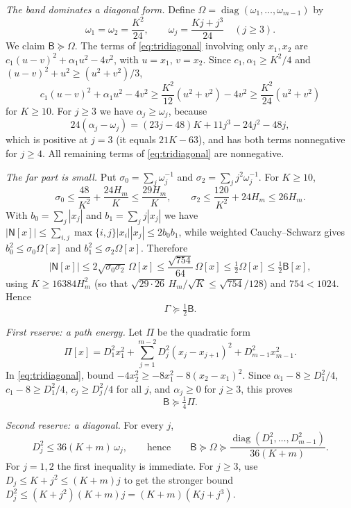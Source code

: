 \documentclass[11pt]{amsart}
\numberwithin{equation}{section}
\theoremstyle{definition}
\theoremstyle{remark}
\DeclareMathOperator{\diag}{diag}
\begin{document}
\emph{The band dominates a diagonal form.} Define
$\Omega=\diag(\omega_1,\dots,\omega_{m-1})$ by
\[
 \omega_1=\omega_2=\frac{K^2}{24},\qquad \omega_j=\frac{Kj+j^3}{24}\quad(j\ge3).
\]
We claim $\mathsf B\succeq\Omega$. The terms of \eqref{eq:tridiagonal}
involving only $x_1,x_2$ are $c_1(u-v)^2+\alpha_1u^2-4v^2$, with
$u=x_1$, $v=x_2$. Since $c_1,\alpha_1\ge K^2/4$ and
$(u-v)^2+u^2\ge(u^2+v^2)/3$,
\[
 c_1(u-v)^2+\alpha_1u^2-4v^2
 \ge\frac{K^2}{12}(u^2+v^2)-4v^2
 \ge\frac{K^2}{24}(u^2+v^2)
\]
for $K\ge10$. For $j\ge3$ we have $\alpha_j\ge\omega_j$, because
\[
 24(\alpha_j-\omega_j)=(23j-48)K+11j^3-24j^2-48j,
\]
which is positive at $j=3$ (it equals $21K-63$), and has both terms
nonnegative for $j\ge4$. All remaining terms of \eqref{eq:tridiagonal}
are nonnegative.

\emph{The far part is small.} Put $\sigma_0=\sum_j\omega_j^{-1}$ and
$\sigma_2=\sum_jj^2\omega_j^{-1}$. For $K\ge10$,
\[
 \sigma_0\le\frac{48}{K^2}+\frac{24H_m}{K}\le\frac{29H_m}{K},
 \qquad
 \sigma_2\le\frac{120}{K^2}+24H_m\le26H_m.
\]
With $b_0=\sum_j|x_j|$ and $b_1=\sum_jj|x_j|$ we have
$|\mathsf N[x]|\le\sum_{i,j}\max\{i,j\}|x_i||x_j|\le2b_0b_1$, while
weighted Cauchy--Schwarz gives $b_0^2\le\sigma_0\Omega[x]$ and
$b_1^2\le\sigma_2\Omega[x]$. Therefore
\begin{equation}\label{eq:remainder}
 |\mathsf N[x]|
 \le2\sqrt{\sigma_0\sigma_2}\,\Omega[x]
 \le\frac{\sqrt{754}}{64}\,\Omega[x]
 \le\tfrac12\Omega[x]\le\tfrac12\mathsf B[x],
\end{equation}
using $K\ge16384H_m^2$ (so that $\sqrt{29\cdot26}\,H_m/\sqrt K\le\sqrt{754}/128$)
and $754<1024$. Hence
\[
 \Gamma\succeq\tfrac12\mathsf B.
\]

\emph{First reserve: a path energy.} Let $\Pi$ be the quadratic form
\[
 \Pi[x]=D_1^2x_1^2+\sum_{j=1}^{m-2}D_j^2(x_j-x_{j+1})^2+D_{m-1}^2x_{m-1}^2.
\]
In \eqref{eq:tridiagonal}, bound $-4x_2^2\ge-8x_1^2-8(x_2-x_1)^2$. Since
$\alpha_1-8\ge D_1^2/4$, $c_1-8\ge D_1^2/4$, $c_j\ge D_j^2/4$ for all $j$,
and $\alpha_j\ge0$ for $j\ge3$, this proves
\begin{equation}\label{eq:path-reserve}
 \mathsf B\succeq\tfrac14\Pi.
\end{equation}

\emph{Second reserve: a diagonal.} For every $j$,
\begin{equation}\label{eq:diagonal-reserve}
 D_j^2\le36(K+m)\,\omega_j,
 \qquad\text{hence}\qquad
 \mathsf B\succeq\Omega\succeq\frac{\diag(D_1^2,\ldots,D_{m-1}^2)}{36(K+m)}.
\end{equation}
For $j=1,2$ the first inequality is immediate. For $j\ge3$, use
$D_j\le K+j^2\le(K+m)j$ to get the stronger bound
$D_j^2\le(K+j^2)(K+m)j=(K+m)(Kj+j^3)$.
\end{document}
